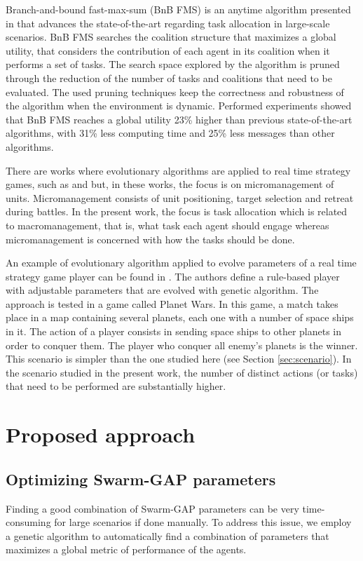 \documentclass[conference]{IEEEtran}
\begin{document}
Branch-and-bound fast-max-sum (BnB FMS) is an anytime algorithm presented in \cite{Macarthur+2011} that advances the state-of-the-art regarding task allocation in large-scale scenarios. BnB FMS searches the coalition structure that maximizes a global utility, that considers the contribution of each agent in its coalition when it performs a set of tasks. The search space explored by the algorithm is pruned through the reduction of the  number of tasks and coalitions that need to be evaluated. The used pruning techniques keep the correctness and robustness of the algorithm when the environment is dynamic. Performed experiments showed that BnB FMS reaches a global utility 23\% higher than previous state-of-the-art algorithms, with 31\% less computing time and 25\% less messages than other algorithms.

There are works where evolutionary algorithms are applied to real time strategy games, such as \cite{Lin&Ting2011} and \cite{Rathe&Boe2012} but, in these works, the focus is on micromanagement of units. Micromanagement consists of unit positioning, target selection and retreat during battles. In the present work, the focus is task allocation which is related to macromanagement, that is, what task each agent should engage whereas micromanagement is concerned with how the tasks should be done.

An example of evolutionary algorithm applied to evolve parameters of a real time strategy game player can be found in \cite{Fernandez-Ares+2011}. The authors define a rule-based player with adjustable parameters that are evolved with genetic algorithm. The approach is tested in a game called Planet Wars. In this game, a match takes place in a map containing several planets, each one with a number of space ships in it. The action of a player consists in sending space ships to other planets in order to conquer them. The player who conquer all enemy's planets is the winner. This scenario is simpler than the one studied here (see Section \ref{sec:scenario}). In the scenario studied in the present work, the number of distinct actions (or tasks) that need to be performed are substantially higher.



\section{Proposed approach}
\label{sec:approach}

\subsection{Optimizing Swarm-GAP parameters}
\label{sec:opt_swgap}
Finding a good combination of Swarm-GAP parameters can be very time-consuming for large scenarios if done manually. To address this issue, we employ a genetic algorithm to automatically find a combination of parameters that maximizes a global metric of performance of the agents.
\end{document}
